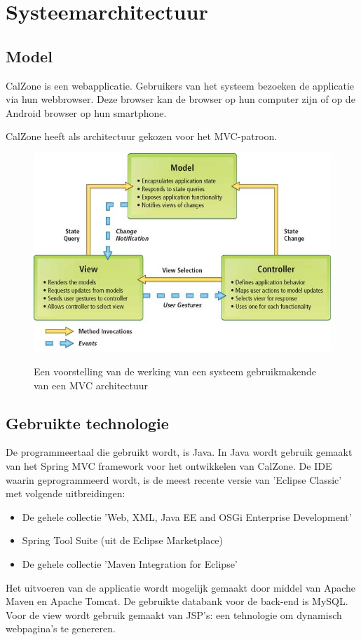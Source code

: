 \chapter{Systeemarchitectuur}
\label{chap:architectuur}

\section{Model}
\label{sec:model}
CalZone is een webapplicatie. Gebruikers van het systeem bezoeken de applicatie via hun webbrowser. Deze browser kan de browser op hun computer  zijn of op de Android browser op hun smartphone.

CalZone heeft als architectuur gekozen voor het MVC-patroon.\cite{mvc}

\begin{figure}[H]
	\centering
	\includegraphics[scale=0.5]{img/mvc.jpg}
	\label{fig:mvc}
	\caption{Een voorstelling van de werking van een systeem gebruikmakende van een MVC architectuur}
\end{figure}

\section{Gebruikte technologie}
\label{sec:technologie}
De programmeertaal die gebruikt wordt, is Java. 
In Java wordt gebruik gemaakt van het Spring MVC framework\cite{spring, spring-mvc} voor het ontwikkelen van CalZone. 
De IDE waarin geprogrammeerd wordt, is de meest recente versie van 'Eclipse Classic' met volgende uitbreidingen:

\begin{itemize}
	\item De gehele collectie 'Web, XML, Java EE and OSGi Enterprise Development'	
	\item Spring Tool Suite (uit de Eclipse Marketplace)
	\item De gehele collectie 'Maven Integration for Eclipse'
\end{itemize}
\noindent
Het uitvoeren van de applicatie wordt mogelijk gemaakt door middel van Apache Maven\cite{Maven} en Apache Tomcat\cite{Tomcat}.
De gebruikte databank voor de back-end is MySQL. 
Voor de view wordt gebruik gemaakt van JSP's: een tehnologie om dynamisch webpagina's te genereren.
